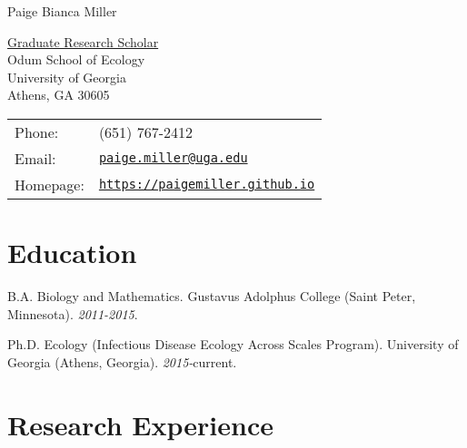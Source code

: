 \documentclass[letterpaper]{article}
\def\name{Paige Bianca Miller}
\renewenvironment{itemize}{
  \begin{list}{}{
    \setlength{\leftmargin}{1.5em}
  }
}{
  \end{list}
}
\begin{document}
{\huge \name}


\vspace{0.25in}

\begin{minipage}{0.45\linewidth}
  \href{}{Graduate Research Scholar} \\
  Odum School of Ecology \\
  University of Georgia \\
  Athens, GA 30605
\end{minipage}
\begin{minipage}{0.45\linewidth}
  \begin{tabular}{ll}
    Phone: & (651) 767-2412 \\
    Email: & \href{mailto:paige.miller@uga.edu}{\tt paige.miller@uga.edu} \\
    Homepage: & \href{https://paigemiller.github.io}{\tt https://paigemiller.github.io} \\
  \end{tabular}
\end{minipage}

\section*{Education}

\begin{itemize}
  \item B.A. Biology and Mathematics. Gustavus Adolphus College (Saint Peter, Minnesota). \textit{2011-2015}.

  \item Ph.D. Ecology (Infectious Disease Ecology Across Scales Program). University of Georgia (Athens, Georgia). \textit{2015-}current.
\end{itemize}

\section*{Research Experience}
\end{document}

